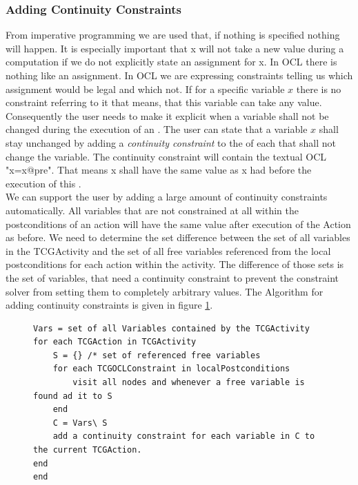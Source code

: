 \subsubsection{Adding Continuity Constraints}
From imperative programming we are used that, if nothing is specified nothing will happen. It is especially important that x will not take a new value during a computation if we do not explicitly state an assignment for x. In OCL there is nothing like an assignment. In OCL we are expressing constraints telling us which assignment would be legal and which not. If for a specific variable $x$ there is no constraint referring to it that means, that this variable can take any value. Consequently the user needs to make it explicit when a variable shall not be changed during the execution of an . The user can state that a variable $x$ shall stay unchanged by adding a \emph{continuity constraint} to the  of each  that shall not change the variable. The continuity constraint will contain the textual OCL "x=x@pre". That means x shall have the same value as x had before the execution of this .\\
We can support the user by adding a large amount of continuity constraints automatically. All variables that are not constrained at all within the postconditions of an action will have the same value after execution of the Action as before. We need to determine the set difference between the set of all variables in the TCGActivity and the set of all free variables referenced from the local postconditions for each action within the activity. The difference of those sets is the set of variables, that need a continuity constraint to prevent the constraint solver from setting them to completely arbitrary values. The Algorithm for adding continuity constraints is given in figure \ref{fig:ContinuitConstraintAlgorithm}.
\begin{figure}\label{fig:ContinuitConstraintAlgorithm}
\begin{verbatim}
Vars = set of all Variables contained by the TCGActivity
for each TCGAction in TCGActivity
	S = {} /* set of referenced free variables
	for each TCGOCLConstraint in localPostconditions
		visit all nodes and whenever a free variable is found ad it to S
	end
	C = Vars\ S
	add a continuity constraint for each variable in C to the current TCGAction.
end
end
\end{verbatim}
\end{figure}
